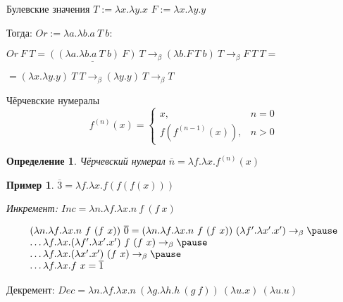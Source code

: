 \documentclass[aspectratio=169]{beamer}
\newtheorem{dfn}{Определение}[section]
\newtheorem{exm}{Пример}[section]
\begin{document}
\begin{frame}{Булевские значения}
$T := \lambda x.\lambda y.x$
$F := \lambda x.\lambda y.y$

Тогда: $Or := \lambda a.\lambda b.a\ T\ b$:

$Or\ F\ T = \underline{((\lambda a.\lambda b.a\ T\ b)\ F)}\ T \rightarrow_\beta (\lambda b.F\ T\ b)\ T
\rightarrow_\beta F\ T\ T =$

$=(\lambda x.\lambda y.y)\ T\ T\rightarrow_\beta (\lambda y.y)\ T \rightarrow_\beta T$
\end{frame}

\begin{frame}{Чёрчевские нумералы}
$$f^{(n)}(x) = \left\{\begin{array}{ll}x, & n = 0\\f(f^{(n-1)}(x)), & n > 0\end{array}\right.$$

\begin{dfn}
Чёрчевский нумерал $\overline{n} = \lambda f.\lambda x.f^{(n)}(x)$
\end{dfn}

\begin{exm}
$\overline{3} = \lambda f.\lambda x.f(f(f(x)))$

Инкремент: $Inc = \lambda n.\lambda f.\lambda x.n\ f\ (f\ x)$
\end{exm}\vspace{-0.3cm}

$$\begin{array}{l}(\lambda n.\lambda f.\lambda x

.n\ f\ (f\ x))\ \overline{0} = (\lambda n.\lambda f.\lambda x.n\ f\ (f\ x))\ (\lambda f'.\lambda x'.x') \rightarrow_\beta \pause\\
  \dots\lambda f.\lambda x.(\lambda f'.\lambda x'.x')\ f\ (f\ x) \rightarrow_\beta \pause\\
  \dots\lambda f.\lambda x.(\lambda x'.x')\ (f\ x) \rightarrow_\beta \pause\\
  \dots\lambda f.\lambda x.f\ x = \overline{1}\end{array}$$
\pause

Декремент: $Dec = \lambda n.\lambda f.\lambda x.n\ (\lambda g.\lambda h.h\ (g\ f))\ (\lambda u.x)\ (\lambda u.u)$
\end{frame}
\end{document}
